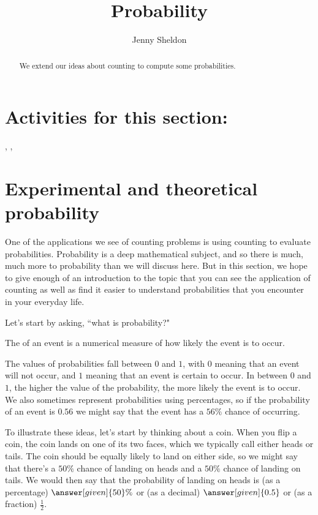 \documentclass{ximera}
\title{Probability}
\author{Jenny Sheldon}
\begin{document}
\begin{abstract}
We extend our ideas about counting to compute some probabilities.
\end{abstract}
\maketitle

\section{Activities for this section:} 
, 
, 







\section{Experimental and theoretical probability}
One of the applications we see of counting problems is using counting to evaluate probabilities. Probability is a deep mathematical subject, and so there is much, much more to probability than we will discuss here. But in this section, we hope to give enough of an introduction to the topic that you can see the application of counting as well as find it easier to understand probabilities that you encounter in your everyday life. 


Let's start by asking, ``what is probability?" 
\begin{definition}
The  of an event is a numerical measure of how likely the event is to occur. 
\end{definition}
The values of probabilities fall between $0$ and $1$, with $0$ meaning that an event will not occur, and $1$ meaning that an event is certain to occur. In between $0$ and $1$, the higher the value of the probability, the more likely the event is to occur. We also sometimes represent probabilities using percentages, so if the probability of an event is $0.56$ we might say that the event has a $56\%$ chance of occurring.

\begin{example}
To illustrate these ideas, let's start by thinking about a coin. When you flip a coin, the coin lands on one of its two faces, which we typically call either heads or tails. The coin should be equally likely to land on either side, so we might say that there's a $50\%$ chance of landing on heads and a $50\%$ chance of landing on tails. We would then say that the probability of landing on heads is (as a percentage) $\answer[given]{50}\%$ or (as a decimal) $\answer[given]{0.5}$ or (as a fraction) $\frac{1}{2}$.
\end{example}
\end{document}
